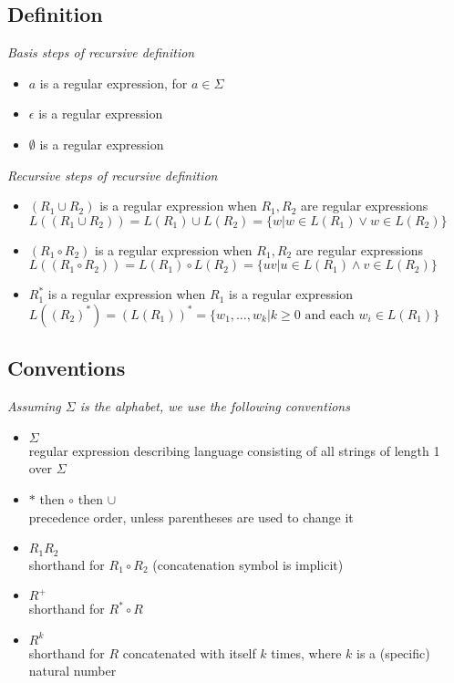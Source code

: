 \documentclass{article}
\begin{document}
\subsection{Definition}
\textit{Basis steps of recursive definition}
\begin{itemize}
    \item $a$ is a regular expression, for $a\in\Sigma$
    \item $\epsilon$ is a regular expression
    \item $\emptyset$ is a regular expression
\end{itemize}
\textit{Recursive steps of recursive definition}
\begin{itemize}
    \item $(R_1\cup R_2)$ is a regular expression when $R_1,R_2$ are regular expressions\\
    $L((R_1\cup R_2))=L(R_1)\cup L(R_2)=\{w\vert w\in L(R_1) \vee w\in L(R_2)\}$
    \item $(R_1\circ R_2)$ is a regular expression when $R_1,R_2$ are regular expressions\\
    $L((R_1\circ R_2))=L(R_1)\circ L(R_2)=\{uv\vert u\in L(R_1) \wedge v\in L(R_2)\}$
    \item $R_1^*$ is a regular expression when $R_1$ is a regular expression\\
    $L((R_2)^*)=(L(R_1))^*=\{w_1,\dots,w_k\vert k\geq 0 \text{ and each } w_i\in L(R_1)\}$
\end{itemize}
\subsection{Conventions}
\textit{Assuming $\Sigma$ is the alphabet, we use the following conventions}
\begin{itemize}
    \item $\Sigma$\\
    regular expression describing language consisting of all strings of length 1 over $\Sigma$
    \item $*$ then $\circ$ then $\cup$\\
    precedence order, unless parentheses are used to change it
    \item $R_1R_2$\\
    shorthand for $R_1\circ R_2$ (concatenation symbol is implicit)
    \item $R^+$\\
    shorthand for $R^*\circ R$
    \item $R^k$\\
    shorthand for $R$ concatenated with itself $k$ times, where $k$ is a (specific) natural number
\end{itemize}
\end{document}
